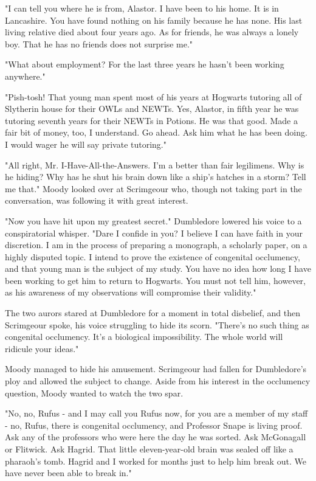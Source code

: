 \documentclass[a4paper,11pt]{article}
\begin{document}
"I can tell you where he is from, Alastor. I have been to his home. It is in Lancashire. You have found nothing on his family because he has none. His last living relative died about four years ago. As for friends, he was always a lonely boy. That he has no friends does not surprise me."

"What about employment? For the last three years he hasn't been working anywhere."

"Pish-tosh! That young man spent most of his years at Hogwarts tutoring all of Slytherin house for their OWLs and NEWTs. Yes, Alastor, in fifth year he was tutoring seventh years for their NEWTs in Potions. He was that good. Made a fair bit of money, too, I understand. Go ahead. Ask him what he has been doing. I would wager he will say private tutoring."

"All right, Mr. I-Have-All-the-Answers. I'm a better than fair legilimens. Why is he hiding? Why has he shut his brain down like a ship's hatches in a storm? Tell me that." Moody looked over at Scrimgeour who, though not taking part in the conversation, was following it with great interest.

"Now you have hit upon my greatest secret." Dumbledore lowered his voice to a conspiratorial whisper. "Dare I confide in you? I believe I can have faith in your discretion. I am in the process of preparing a monograph, a scholarly paper, on a highly disputed topic. I intend to prove the existence of congenital occlumency, and that young man is the subject of my study. You have no idea how long I have been working to get him to return to Hogwarts. You must not tell him, however, as his awareness of my observations will compromise their validity."

The two aurors stared at Dumbledore for a moment in total disbelief, and then Scrimgeour spoke, his voice struggling to hide its scorn. "There's no such thing as congenital occlumency. It's a biological impossibility. The whole world will ridicule your ideas."

Moody managed to hide his amusement. Scrimgeour had fallen for Dumbledore's ploy and allowed the subject to change. Aside from his interest in the occlumency question, Moody wanted to watch the two spar.

"No, no, Rufus - and I may call you Rufus now, for you are a member of my staff - no, Rufus, there is congenital occlumency, and Professor Snape is living proof. Ask any of the professors who were here the day he was sorted. Ask McGonagall or Flitwick. Ask Hagrid. That little eleven-year-old brain was sealed off like a pharaoh's tomb. Hagrid and I worked for months just to help him break out. We have never been able to break in."
\end{document}
